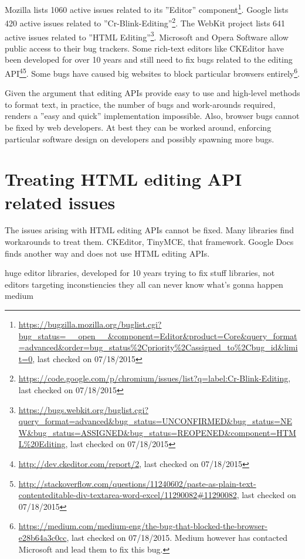 \noindent Mozilla lists 1060 active issues related to its ''Editor'' component\footnote{\url{https://bugzilla.mozilla.org/buglist.cgi?bug\_status=\_\_open\_\_\&component=Editor\&product=Core\&query\_format=advanced\&order=bug\_status\%2Cpriority\%2Cassigned\_to\%2Cbug\_id\&limit=0}, last checked on 07/18/2015}. Google lists 420 active issues related to ''Cr-Blink-Editing''\footnote{\url{https://code.google.com/p/chromium/issues/list?q=label:Cr-Blink-Editing}, last checked on 07/18/2015}. The WebKit project lists 641 active issues related to ''HTML Editing''\footnote{\url{https://bugs.webkit.org/buglist.cgi?query\_format=advanced\&bug\_status=UNCONFIRMED\&bug\_status=NEW\&bug\_status=ASSIGNED\&bug\_status=REOPENED\&component=HTML\%20Editing}, last checked on 07/18/2015}. Microsoft and Opera Software allow public access to their bug trackers. Some rich-text editors like CKEditor have been developed for over 10 years and still need to fix bugs related to the editing API\footnote{\url{http://dev.ckeditor.com/report/2}, last checked on 07/18/2015}\footnote{\url{http://stackoverflow.com/questions/11240602/paste-as-plain-text-contenteditable-div-textarea-word-excel/11290082#11290082}, last checked on 07/18/2015}. Some bugs have caused big websites to block particular browsers entirely\footnote{\url{https://medium.com/medium-eng/the-bug-that-blocked-the-browser-e28b64a3c0cc}, last checked on 07/18/2015. Medium however has contacted Microsoft and lead them to fix this bug.}.

Given the argument that editing APIs provide easy to use and high-level methods to format text, in practice, the number of bugs and work-arounds required, renders a ''easy and quick'' implementation impossible. Also, browser bugs cannot be fixed by web developers. At best they can be worked around, enforcing particular software design on developers and possibly spawning more bugs.

\section{Treating HTML editing API related issues}

The issues arising with HTML editing APIs cannot be fixed. Many libraries find workarounds to treat them. CKEditor, TinyMCE, that framework. Google Docs finds another way and does not use HTML editing APIs.

huge editor libraries, developed for 10 years trying to fix stuff
libraries, not editors targeting inconstiencies
they all can never know what's gonna happen
medium

